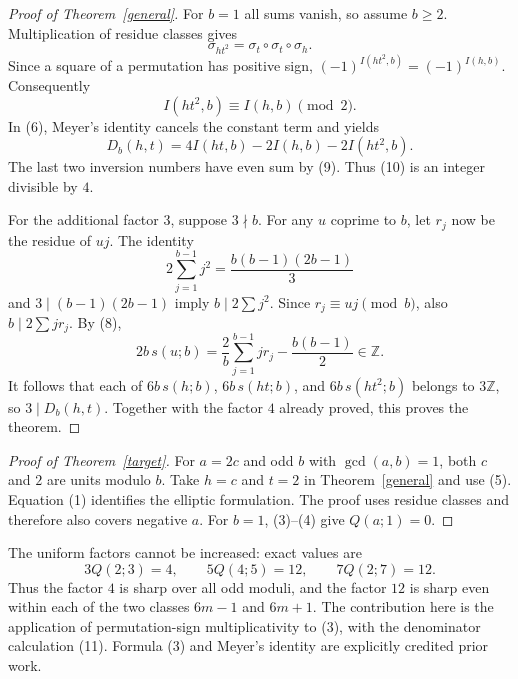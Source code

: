 \documentclass[11pt]{article}
\newcommand{\Z}{\mathbb Z}
\begin{document}
\begin{proof}[Proof of Theorem~\ref{general}]
For $b=1$ all sums vanish, so assume $b\ge2$. Multiplication of
residue classes gives
\[
 \sigma_{ht^2}=\sigma_t\circ\sigma_t\circ\sigma_h.
\]
Since a square of a permutation has positive sign,
$(-1)^{I(ht^2,b)}=(-1)^{I(h,b)}$. Consequently
\[
 I(ht^2,b)\equiv I(h,b)\pmod2.                                   \tag{9}
\]
In (6), Meyer's identity cancels the constant term and yields
\[
 D_b(h,t)=4I(ht,b)-2I(h,b)-2I(ht^2,b).                             \tag{10}
\]
The last two inversion numbers have even sum by (9). Thus (10)
is an integer divisible by $4$.

For the additional factor $3$, suppose $3\nmid b$. For any
$u$ coprime to $b$, let $r_j$ now be the residue of $uj$. The identity
\[
 2\sum_{j=1}^{b-1}j^2=\frac{b(b-1)(2b-1)}3
\]
and $3\mid(b-1)(2b-1)$ imply $b\mid2\sum j^2$.
Since $r_j\equiv uj\pmod b$, also $b\mid2\sum j r_j$. By (8),
\[
 2b\,s(u;b)=\frac2b\sum_{j=1}^{b-1}j r_j-\frac{b(b-1)}2\in\Z.
                                                                    \tag{11}
\]
It follows that each of $6b\,s(h;b)$, $6b\,s(ht;b)$, and
$6b\,s(ht^2;b)$ belongs to $3\Z$, so $3\mid D_b(h,t)$.
Together with the factor $4$ already proved, this proves the theorem.
\end{proof}

\begin{proof}[Proof of Theorem~\ref{target}]
For $a=2c$ and odd $b$ with $\gcd(a,b)=1$, both $c$ and $2$ are
units modulo $b$. Take $h=c$ and $t=2$ in Theorem~\ref{general}
and use (5). Equation (1) identifies the elliptic formulation.
The proof uses residue classes and therefore also covers negative
$a$. For $b=1$, (3)--(4) give $Q(a;1)=0$.
\end{proof}

The uniform factors cannot be increased: exact values are
\[
 3Q(2;3)=4,\qquad 5Q(4;5)=12,\qquad 7Q(2;7)=12.
\]
Thus the factor $4$ is sharp over all odd moduli, and the factor
$12$ is sharp even within each of the two classes $6m-1$ and $6m+1$.
The contribution here is the application of permutation-sign
multiplicativity to (3), with the denominator calculation (11).
Formula (3) and Meyer's identity are explicitly credited prior work.
\end{document}
